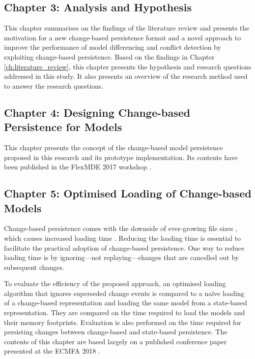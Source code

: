 \subsection{Chapter 3: Analysis and Hypothesis}
\label{sec:ch:analysis_and_hypothesis}
This chapter summarises on the findings of the literature review and presents the motivation for a new change-based persistence format and a novel approach to improve the performance of model differencing and conflict detection by exploiting change-based persistence. Based on the findings in Chapter \ref{ch:literature_review}, this chapter presents the hypothesis and research questions addressed in this study. It also presents an overview of the research method used to answer the research questions.

\subsection{Chapter 4: Designing Change-based Persistence for Models}
\label{sec:chapter_3_Change-based_model_ersistence_plan}
This chapter presents the concept of the change-based model persistence proposed in this research and its prototype implementation. Its contents have been published in the FlexMDE 2017 workshop \cite{DBLP:conf/models/YohannisKP17}.

\subsection{Chapter 5: Optimised Loading of Change-based Models}
\label{sec:chapter_4_optimised_loading_change_based_model_persistence}

Change-based persistence comes with the downside of ever-growing file sizes \cite{DBLP:journals/entcs/RobbesL07,DBLP:conf/edoc/KoegelHLHD10}, which causes increased loading time \cite{mens2002state}. Reducing the loading time is essential to facilitate the practical adoption of change-based persistence. One way to reduce loading time is by ignoring—not replaying—changes that are cancelled out by subsequent changes.

To evaluate the efficiency of the proposed approach, an optimised loading algorithm that ignores superseded change events is compared to a naïve loading of a change-based representation and loading the same model from a state-based representation. They are compared on the time required to load the models and their memory footprints. Evaluation is also performed on the time required for persisting changes between change-based and state-based persistence. The contents of this chapter are based largely on a published conference paper presented at the ECMFA 2018 \cite{yohannis2018towards}.

